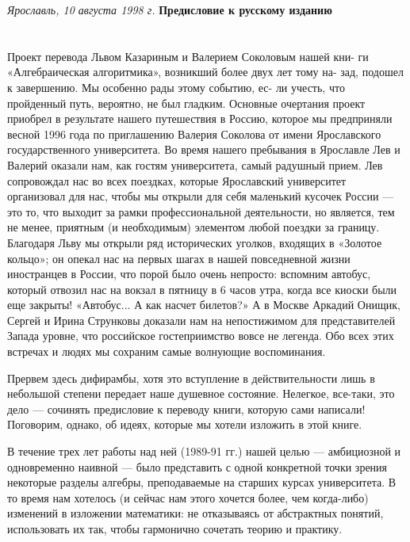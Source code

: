 {{\hspace{3.0in} \textit {Ярославль, 10 августа 1998 г.}
\newpage
\cleartop
\vspace*{50pt}
\hspace{1.4cm} {\Large \textbf {Предисловие к русскому изданию}}
\newline\\
\hspace*{15pt}
\hspace*{15pt}
\\\\
Проект перевода Львом Казариным и Валерием Соколовым нашей кни-
ги «Алгебраическая алгоритмика», возникший более двух лет тому на-
зад, подошел к завершению. Мы особенно рады этому событию, ес-
ли учесть, что пройденный путь, вероятно, не был гладким. Основные очертания проект приобрел в результате нашего путешествия в Россию, которое мы предприняли весной 1996 года по приглашению Валерия Соколова от имени Ярославского государственного университета. Во время нашего пребывания в Ярославле Лев и Валерий оказали нам, как гостям университета, самый радушный прием. Лев сопровождал нас во всех поездках, которые Ярославский университет организовал для нас, чтобы мы открыли для себя маленький кусочек России — это то, что выходит за рамки профессиональной деятельности, но является, тем не менее, приятным (и необходимым) элементом любой поездки за границу. Благодаря Льву мы открыли ряд исторических уголков, входящих в «Золотое кольцо»; он опекал нас на первых шагах в нашей повседневной жизни иностранцев в России, что порой было очень непросто: вспомним автобус, который отвозил нас на вокзал в пятницу в 6 часов утра, когда все киоски были еще закрыты! «Автобус... А как насчет билетов?» А в Москве Аркадий Онищик, Сергей и Ирина Струнковы доказали нам на непостижимом для представителей Запада уровне, что российское гостеприимство вовсе не легенда. Обо всех этих встречах и людях мы сохраним самые волнующие воспоминания.

   Прервем здесь дифирамбы, хотя это вступление в действительности лишь в небольшой степени передает наше душевное состояние. Нелегкое, все-таки, это дело — сочинять предисловие к переводу книги, которую сами написали! Поговорим, однако, об идеях, которые мы хотели изложить в этой книге.

   В течение трех лет работы над ней (1989-91 гг.) нашей целью — амбициозной и одновременно наивной — было представить с одной конкретной точки зрения некоторые разделы алгебры, преподаваемые на старших курсах университета. В то время нам хотелось (и сейчас нам этого хочется более, чем когда-либо) изменений в изложении математики: не отказываясь от абстрактных понятий, использовать их так, чтобы гармонично сочетать теорию и практику.
   
}}
